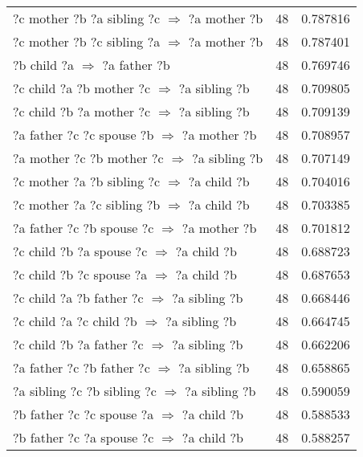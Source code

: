 \begin{longtable}{lrr}
     ?c  mother  ?b  ?a  sibling  ?c   $\Rightarrow$ ?a  mother  ?b &           48 &        0.787816 \\
     ?c  mother  ?b  ?c  sibling  ?a   $\Rightarrow$ ?a  mother  ?b &           48 &        0.787401 \\
                       ?b  child  ?a   $\Rightarrow$ ?a  father  ?b &           48 &        0.769746 \\
      ?c  child  ?a  ?b  mother  ?c   $\Rightarrow$ ?a  sibling  ?b &           48 &        0.709805 \\
      ?c  child  ?b  ?a  mother  ?c   $\Rightarrow$ ?a  sibling  ?b &           48 &        0.709139 \\
      ?a  father  ?c  ?c  spouse  ?b   $\Rightarrow$ ?a  mother  ?b &           48 &        0.708957 \\
     ?a  mother  ?c  ?b  mother  ?c   $\Rightarrow$ ?a  sibling  ?b &           48 &        0.707149 \\
      ?c  mother  ?a  ?b  sibling  ?c   $\Rightarrow$ ?a  child  ?b &           48 &        0.704016 \\
      ?c  mother  ?a  ?c  sibling  ?b   $\Rightarrow$ ?a  child  ?b &           48 &        0.703385 \\
      ?a  father  ?c  ?b  spouse  ?c   $\Rightarrow$ ?a  mother  ?b &           48 &        0.701812 \\
        ?c  child  ?b  ?a  spouse  ?c   $\Rightarrow$ ?a  child  ?b &           48 &        0.688723 \\
        ?c  child  ?b  ?c  spouse  ?a   $\Rightarrow$ ?a  child  ?b &           48 &        0.687653 \\
      ?c  child  ?a  ?b  father  ?c   $\Rightarrow$ ?a  sibling  ?b &           48 &        0.668446 \\
       ?c  child  ?a  ?c  child  ?b   $\Rightarrow$ ?a  sibling  ?b &           48 &        0.664745 \\
      ?c  child  ?b  ?a  father  ?c   $\Rightarrow$ ?a  sibling  ?b &           48 &        0.662206 \\
     ?a  father  ?c  ?b  father  ?c   $\Rightarrow$ ?a  sibling  ?b &           48 &        0.658865 \\
   ?a  sibling  ?c  ?b  sibling  ?c   $\Rightarrow$ ?a  sibling  ?b &           48 &        0.590059 \\
       ?b  father  ?c  ?c  spouse  ?a   $\Rightarrow$ ?a  child  ?b &           48 &        0.588533 \\
       ?b  father  ?c  ?a  spouse  ?c   $\Rightarrow$ ?a  child  ?b &           48 &        0.588257 \\

\end{longtable}

